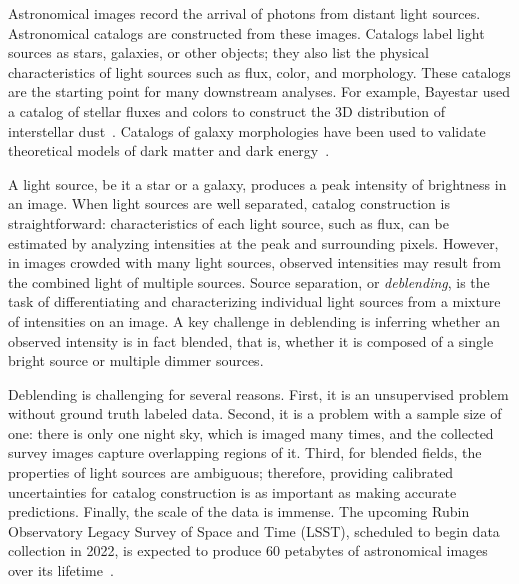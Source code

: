 Astronomical images record the arrival of photons from distant light sources. 
Astronomical catalogs are constructed from these images.
Catalogs label light sources as stars, galaxies, or other objects; they also list the physical characteristics of light sources such as flux, color, and morphology. 
These catalogs are the starting point for many downstream analyses.
For example, Bayestar used a catalog of stellar fluxes and colors to construct the 3D distribution of interstellar dust~\citep{Green_2019_argonaut}. 
Catalogs of galaxy morphologies have been used to validate theoretical models of dark matter and dark energy~\citep{Abbott2018}. 

A light source, be it a star or a galaxy, produces a peak intensity of brightness in an image. 
When light sources are well separated, catalog construction is straightforward: characteristics of each light source, such as flux, can be estimated by analyzing intensities at the peak and surrounding pixels. 
However, in images crowded with many light sources, observed intensities may result from the combined light of multiple sources.
Source separation, or {\itshape deblending}, is the task of differentiating and characterizing individual light sources from a mixture of intensities on an image. 
A key challenge in deblending is inferring whether an observed intensity is in fact blended, that is, whether it is composed of a single bright source or multiple dimmer sources. 


Deblending is challenging for several reasons.
First, it is an unsupervised problem without ground truth labeled data. 
Second, it is a problem with a sample size of one: there is only one night sky, which is imaged many times, and the collected survey images capture overlapping regions of it.
Third, for blended fields, the properties of light sources are ambiguous; therefore, providing calibrated uncertainties for catalog construction is as important as making accurate predictions.
Finally, the scale of the data is immense. 
The upcoming Rubin Observatory Legacy Survey of Space and Time (LSST), scheduled to begin data collection in 2022, is expected to produce 60 petabytes of astronomical images over its lifetime~\citep{LSSTabout}.


